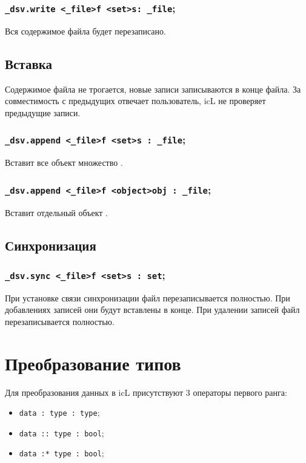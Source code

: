 \documentclass[a4paper, 14pt]{extarticle}
\newenvironment{icItems}
	{ \begin{itemize} [noitemsep,nolistsep] }
	{ \end{itemize} }
\begin{document}
\subsubsection{\lstinline|_dsv.write <_file>f <set>s: _file|;}

Вся содержимое файла будет перезаписано.

\subsection{Вставка}

Содержимое файла не трогается, новые записи записываются в конце файла. За совместимость с предыдущих отвечает пользователь, icL не проверяет предыдущие записи.

\subsubsection{\lstinline|_dsv.append <_file>f <set>s : _file|;}

Вставит все объект множество .

\subsubsection{\lstinline|_dsv.append <_file>f <object>obj : _file|;}

Вставит отдельный объект .

\subsection{Синхронизация}

\subsubsection{\lstinline|_dsv.sync <_file>f <set>s : set|;}

При установке связи синхронизации файл перезаписывается полностью. При добавлениях записей они будут вставлены в конце. При удалении записей файл перезаписывается полностью.

\section{Преобразование типов}

Для преобразования данных в icL присутствуют 3 операторы первого ранга:
\begin{icItems}
	\item \lstinline|data : type : type|;
	\item \lstinline|data :: type : bool|;
	\item \lstinline|data :* type : bool|;
\end{icItems}
\end{document}
